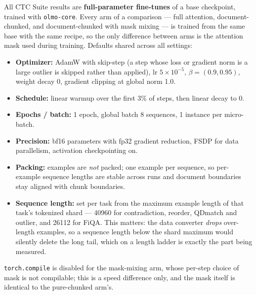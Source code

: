\begin{claudeblock}
All CTC Suite results are \textbf{full-parameter fine-tunes} of a base checkpoint, trained with
\texttt{olmo-core}. Every arm of a comparison --- full attention, document-chunked, and
document-chunked with mask mixing --- is trained from the same base with the same recipe, so the
only difference between arms is the attention mask used during training. Defaults shared across
all settings:

\begin{itemize}
\item \textbf{Optimizer:} AdamW with skip-step (a step whose loss or gradient norm is a large
outlier is skipped rather than applied), lr $5\!\times\!10^{-5}$, $\beta = (0.9, 0.95)$, weight
decay 0, gradient clipping at global norm 1.0.
\item \textbf{Schedule:} linear warmup over the first 3\% of steps, then linear decay to 0.
\item \textbf{Epochs / batch:} 1 epoch, global batch 8 sequences, 1 instance per micro-batch.
\item \textbf{Precision:} bf16 parameters with fp32 gradient reduction, FSDP for data parallelism,
activation checkpointing on.
\item \textbf{Packing:} examples are \emph{not} packed; one example per sequence, so per-example
sequence lengths are stable across runs and document boundaries stay aligned with chunk boundaries.
\item \textbf{Sequence length:} set per task from the maximum example length of that task's
tokenized shard --- 40960 for contradiction, reorder, QDmatch and outlier, and 26112 for FiQA.
This matters: the data converter \emph{drops} over-length examples, so a sequence length below the
shard maximum would silently delete the long tail, which on a length ladder is exactly the part
being measured.
\end{itemize}

\texttt{torch.compile} is disabled for the mask-mixing arm, whose per-step choice of mask is not
compilable; this is a speed difference only, and the mask itself is identical to the pure-chunked
arm's.
\end{claudeblock}



